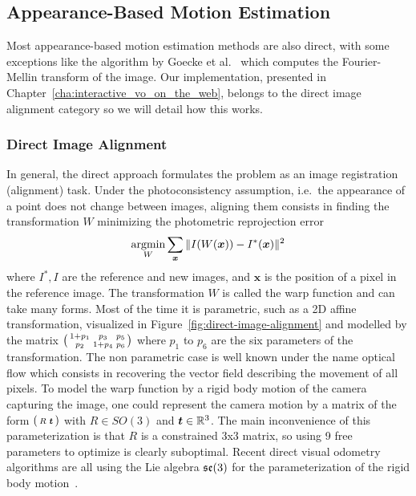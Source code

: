 \subsection{Appearance-Based Motion Estimation}%
\label{sub:appearance-based}

Most appearance-based motion estimation methods are also direct,
with some exceptions like the algorithm by Goecke et al.~\cite{goecke2007visual}
which computes the Fourier-Mellin transform of the image.
Our implementation, presented in Chapter~\ref{cha:interactive_vo_on_the_web},
belongs to the direct image alignment category
so we will detail how this works.

\subsubsection{Direct Image Alignment}%
\label{ssub:direct-image-alignment}

In general, the direct approach formulates the problem as an
image registration (alignment) task.
Under the photoconsistency assumption, i.e.\ the appearance of a point
does not change between images, aligning them consists in
finding the transformation $W$ minimizing the photometric reprojection error
\[
	\operatorname*{argmin}_{W} \sum_{\bm{x}}\|I(W(\bm{x})) - I^{*}(\bm{x})\|^2
\]
where $I^{*}, I$ are the reference and new images,
and $\bm{x}$ is the position of a pixel in the reference image.
The transformation $W$ is called the warp function and can take many forms.
Most of the time it is parametric, such as a 2D affine transformation,
visualized in Figure~\ref{fig:direct-image-alignment} and modelled
by the matrix $\left(\begin{smallmatrix} 
		1 + p_1 & p_3     & p_5 \\
		p_2     & 1 + p_4 & p_6 \end{smallmatrix} \right)$
where $p_1$ to $p_6$ are the six parameters of the transformation.
The non parametric case is well known under the name optical flow
which consists in recovering the vector field describing the movement of all pixels.
To model the warp function by a rigid body motion of the camera capturing the image,
one could represent the camera motion by a matrix of the form $\left(\begin{smallmatrix} R & \bm{t} \end{smallmatrix} \right)$
with $R \in SO(3)$ and $\bm{t} \in \mathbb{R}^3$.
The main inconvenience of this parameterization is that $R$ is a constrained 3x3 matrix,
so using 9 free parameters to optimize is clearly suboptimal.
Recent direct visual odometry algorithms are all using
the Lie algebra $\mathfrak{se}(3)$ for the parameterization of the rigid body
motion~\cite{newcombe2011dtam, audras2011real, kerl2013robust,
klose2013efficient, forster2014svo, engel2017direct}.

